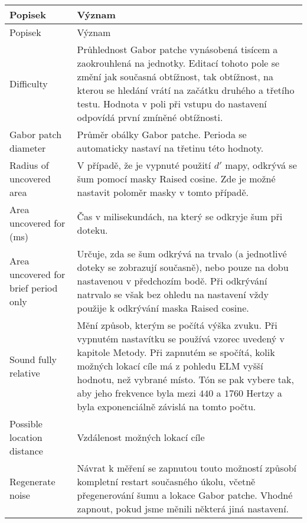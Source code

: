 {
\renewcommand{\arraystretch}{2}
\begin{longtable}{p{}p{}}
\hline
\hline
\rowcolor{white}
Popisek & Význam \\
\hline
\endfirsthead
\hline
\hline
\rowcolor{white}
Popisek & Význam \\
\hline
\endhead
\hline
\endfoot
\hline
\hline
\endlastfoot

Difficulty & Průhlednost Gabor patche vynásobená tisícem a zaokrouhlená na
jednotky. Editací tohoto pole se změní jak současná obtížnost, tak obtížnost,
na kterou se hledání vrátí na začátku druhého a třetího testu. Hodnota v poli
při vstupu do nastavení odpovídá první zmíněné obtížnosti.\\

Gabor patch diameter & Průměr obálky Gabor patche. Perioda se automaticky
nastaví na třetinu této hodnoty. \index{Gabor patch}\\

Radius of uncovered area & V případě, že je vypnuté použití $d'$ mapy\index{d'
mapa@$d'$ mapa}, odkrývá se šum pomocí masky Raised cosine. Zde je možné
nastavit poloměr masky v tomto případě.\\ 

Area uncovered for (ms) & Čas v milisekundách, na který se odkryje šum při
doteku.\\

Area uncovered for brief period only & Určuje, zda se šum odkrývá na trvalo (a
jednotlivé doteky se zobrazují současně), nebo pouze na dobu nastavenou v
předchozím bodě. Při odkrývání natrvalo se však bez ohledu na nastavení vždy
použije k odkrývání maska Raised cosine.\\

Sound fully relative & Mění způsob, kterým se počítá výška zvuku. Při vypnutém
nastavítku se používá vzorec uvedený v kapitole Metody. Při zapnutém se
spočítá, kolik možných lokací cíle má z pohledu ELM vyšší hodnotu, než vybrané
místo. Tón se pak vybere tak, aby jeho frekvence byla mezi $440$ a $1760$
Hertzy a byla exponenciálně závislá na tomto počtu. \\

Possible location distance & Vzdálenost možných lokací cíle \\

Regenerate noise & Návrat k měření se zapnutou touto možností způsobí kompletní
restart současného úkolu, včetně přegenerování šumu a lokace Gabor patche.
Vhodné zapnout, pokud jsme měnili některá jiná nastavení. \\


\end{longtable}}
